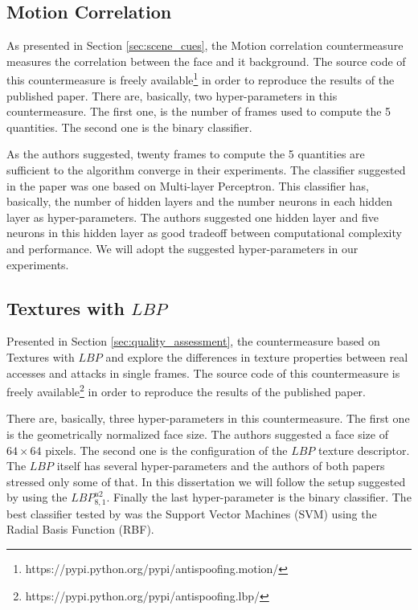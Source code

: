 \subsection{Motion Correlation}

As presented in Section \ref{sec:scene_cues}, the Motion correlation \cite{AnjosIJCB2011} countermeasure measures the correlation between the face and it background. The source code of this countermeasure is freely available\footnote{https://pypi.python.org/pypi/antispoofing.motion/} in order to reproduce the results of the published paper. There are, basically, two hyper-parameters in this countermeasure. The first one, is the number of frames used to compute the 5 quantities. The second one is the binary classifier.

As the authors suggested, twenty frames to compute the 5 quantities are sufficient to the algorithm converge in their experiments. The classifier suggested in the paper was one based on Multi-layer Perceptron. This classifier has, basically, the number of hidden layers and the number neurons in each hidden layer as hyper-parameters. The authors suggested one hidden layer and five neurons in this hidden layer as good tradeoff between computational complexity and performance. We will adopt the suggested hyper-parameters in our experiments.

\subsection{Textures with $LBP$}

Presented in Section \ref{sec:quality_assessment}, the countermeasure based on Textures with $LBP$ \cite{ChingovskaBIOSIG2012} and \cite{maatta2011face} explore the differences in texture properties between real accesses and attacks in single frames. The source code of this countermeasure is freely available\footnote{https://pypi.python.org/pypi/antispoofing.lbp/} in order to reproduce the results of the published paper.

There are, basically, three hyper-parameters in this countermeasure. The first one is the geometrically normalized face size. The authors suggested a face size of $64 \times 64$ pixels. The second one is the configuration of the $LBP$ texture descriptor. The $LBP$ itself has several hyper-parameters \cite{inen2011computer} and the authors of both papers stressed only some of that. In this dissertation we will follow the setup suggested by \cite{ChingovskaBIOSIG2012} using the $LBP_{8,1}^{u2}$. Finally the last hyper-parameter is the binary classifier. The best classifier tested by \cite{ChingovskaBIOSIG2012} was the Support Vector Machines (SVM) using the Radial Basis Function (RBF). 

